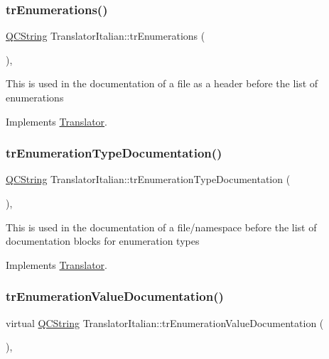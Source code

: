 \subsubsection{\texorpdfstring{trEnumerations()}{trEnumerations()}}
{\footnotesize\ttfamily \mbox{\hyperlink{class_q_c_string}{Q\+C\+String}} Translator\+Italian\+::tr\+Enumerations (\begin{DoxyParamCaption}{ }\end{DoxyParamCaption})\hspace{0.3cm}{\ttfamily [inline]}, {\ttfamily [virtual]}}

This is used in the documentation of a file as a header before the list of enumerations 

Implements \mbox{\hyperlink{class_translator}{Translator}}.

\mbox{\label{class_translator_italian_a8579c730e25b0653237e0d2ceb800fe5}} 
\subsubsection{\texorpdfstring{trEnumerationTypeDocumentation()}{trEnumerationTypeDocumentation()}}
{\footnotesize\ttfamily \mbox{\hyperlink{class_q_c_string}{Q\+C\+String}} Translator\+Italian\+::tr\+Enumeration\+Type\+Documentation (\begin{DoxyParamCaption}{ }\end{DoxyParamCaption})\hspace{0.3cm}{\ttfamily [inline]}, {\ttfamily [virtual]}}

This is used in the documentation of a file/namespace before the list of documentation blocks for enumeration types 

Implements \mbox{\hyperlink{class_translator}{Translator}}.

\mbox{\label{class_translator_italian_a7988405bff5d4d2e991928eae3403dc9}} 
\subsubsection{\texorpdfstring{trEnumerationValueDocumentation()}{trEnumerationValueDocumentation()}}
{\footnotesize\ttfamily virtual \mbox{\hyperlink{class_q_c_string}{Q\+C\+String}} Translator\+Italian\+::tr\+Enumeration\+Value\+Documentation (\begin{DoxyParamCaption}{ }\end{DoxyParamCaption})\hspace{0.3cm}{\ttfamily [inline]}, {\ttfamily [virtual]}}

